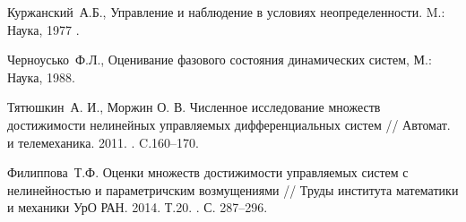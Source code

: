 
%

%

\begin{thebibliography}{9} %




 Куржанский~А.Б., Управление и наблюдение в условиях неопределенности. M.:~ Наука, 1977 .

Черноусько~Ф.Л., Оценивание фазового состояния динамических систем, М.:~ Наука, 1988.

 Тятюшкин~А. И.,  Моржин О. В.  Численное исследование множеств достижимости нелинейных управляемых дифференциальных систем // Автомат. и телемеханика. 2011. . C.160--170.

Филиппова~Т.Ф. Оценки множеств достижимости управляемых систем с нелинейностью и параметричским возмущениями // Труды института математики и механики УрО РАН. 2014. Т.20. . С. 287--296.



\end{thebibliography}
